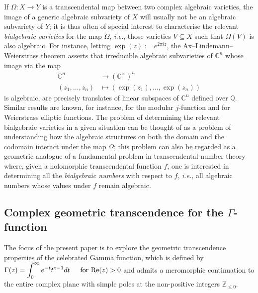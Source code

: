 \documentclass[11pt,reqno]{amsart}
\theoremstyle{definition}
\numberwithin{equation}{section}
\renewcommand{\Re}{\mathrm{Re}}
\begin{document}
If $\Omega: X \rightarrow Y$ is a transcendental map between two complex algebraic varieties, the image of a generic algebraic subvariety of $X$ will usually not be an algebraic subvariety of $Y$; it is thus often of special interest to characterise the relevant \textit{bialgebraic varieties} for the map $\Omega$, \textit{i.e.},  those varieties $V \subseteq X$ such that $\Omega(V)$ is also algebraic. 
For instance, letting $\exp(z):=e^{2 \pi i z}$, the Ax--Lindemann--Weierstrass theorem asserts that irreducible algebraic subvarieties of $\mathbb C^n$ whose image via the map 
\begin{align*}
\mathbb C^n & \rightarrow (\mathbb C^\times)^n \\
(z_1, \ldots, z_n) & \mapsto (\exp(z_1), \ldots ,\exp(z_n))
\end{align*}
is algebraic, are precisely translates of linear subspaces of $\mathbb C^n$ defined over $\mathbb Q$. Similar results are known, for instance, for the modular $j$-function and for Weierstrass elliptic functions. %
The problem of determining the relevant bialgebraic varieties in a given situation %
can be thought of as a problem of  understanding how the algebraic structures on both the domain and the codomain interact under the map $\Omega$; this problem can 
also be regarded as a geometric analogue of a fundamental problem in transcendental number theory where, given a holomorphic transcendental function $f$, one is interested in determining all the \textit{bialgebraic numbers} with respect to $f$,  \textit{i.e.}, all algebraic numbers whose values under $f$ remain algebraic. 

\subsection{Complex geometric transcendence for the $\Gamma$-function}

The focus of the present paper is to explore the geometric transcendence properties of the celebrated Gamma function, which is defined by 
$\begin{displaystyle}
\Gamma(z)= \int_{0}^{\infty} e^{-t} t^{z-1} dt    \hspace{4mm} \text{ for } \Re(z)>0 \end{displaystyle}$ and admits a meromorphic continuation to the entire complex plane with simple poles at the non-positive integers $\mathbb Z_{\leq 0}$. 
\end{document}

